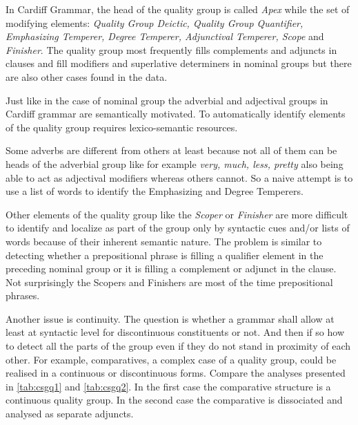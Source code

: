 	In Cardiff Grammar, the head of the quality group is called \textit{Apex} while the set of modifying elements: \textit{Quality Group Deictic, Quality Group Quantifier, Emphasizing Temperer, Degree Temperer, Adjunctival Temperer, Scope} and \textit{Finisher}. The quality group most frequently fills complements and adjuncts in clauses and fill modifiers and superlative determiners in nominal groups but there are also other cases found in the data. 
	
	Just like in the case of nominal group the adverbial and adjectival groups in Cardiff grammar are semantically motivated. To automatically identify elements of the quality group requires lexico-semantic resources.
    
    Some adverbs are different from others at least because not all of them can be heads of the adverbial group like for example \textit{very, much, less, pretty} also being able to act as adjectival modifiers whereas others cannot. So a naive attempt is to use a list of words to identify the Emphasizing and Degree Temperers. 
    
    Other elements of the quality group like the \textit{Scoper} or \textit{Finisher} are more difficult to identify and localize as part of the group only by syntactic cues and/or lists of words because of their inherent semantic nature. The problem is similar to detecting whether a prepositional phrase is filling a qualifier element in the preceding nominal group or it is filling a complement or adjunct in the clause. Not surprisingly the Scopers and Finishers are most of the time prepositional phrases. 
	
	Another issue is continuity. The question is whether a grammar shall allow at least at syntactic level for discontinuous constituents or not. And then if so how to detect all the parts of the group even if they do not stand in proximity of each other. For example, comparatives, a complex case of a quality group, could be realised in a continuous or discontinuous forms. Compare the analyses presented in \ref{tab:csgq1} and \ref{tab:csgq2}. In the first case the comparative structure is a continuous quality group. In the second case the comparative is dissociated and analysed as separate adjuncts. 
	
